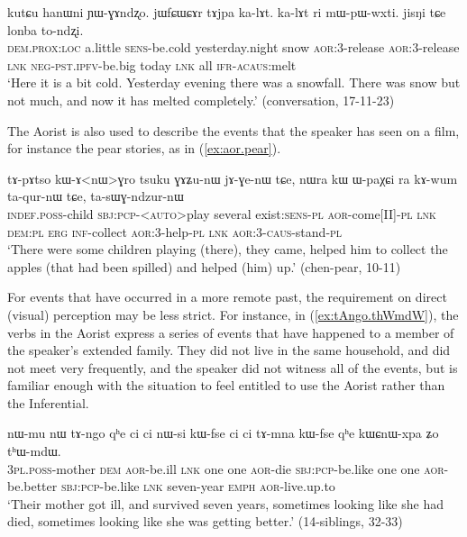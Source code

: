 \begin{exe}
\ex \label{ex:jWfCWCAr.tAjpa.kalAt}
 \gll kutɕu hanɯni ɲɯ-ɣɤndʐo. jɯfɕɯɕɤr tɤjpa ka-lɤt. ka-lɤt ri mɯ-pɯ-wxti. jisŋi tɕe lonba to-ndʐi. \\
 \textsc{dem}.\textsc{prox}:\textsc{loc} a.little \textsc{sens}-be.cold yesterday.night snow \textsc{aor}:3\flobv{}-release \textsc{aor}:3\flobv{}-release  \textsc{lnk} \textsc{neg}-\textsc{pst}.\textsc{ipfv}-be.big today \textsc{lnk} all \textsc{ifr}-\textsc{acaus}:melt \\
\glt `Here it is a bit cold. Yesterday evening there was a snowfall. There was snow but not much, and now it has melted completely.' (conversation, 17-11-23)
\end{exe}

The Aorist is also used to describe the events that the speaker has seen on a film, for instance the pear stories, as in (\ref{ex:aor.pear}). 

\begin{exe}
\ex \label{ex:aor.pear}
 \gll tɤ-pɤtso kɯ-ɤ<nɯ>ɣro tsuku ɣɤʑu-nɯ jɤ-ɣe-nɯ tɕe, nɯra kɯ ɯ-paχɕi ra kɤ-wum ta-qur-nɯ tɕe, ta-sɯɣ-ndzur-nɯ \\
 \textsc{indef}.\textsc{poss}-child \textsc{sbj}:\textsc{pcp}-<\textsc{auto}>play several exist:\textsc{sens}-\textsc{pl} \textsc{aor}-come[II]-\textsc{pl} \textsc{lnk} \textsc{dem}:\textsc{pl} \textsc{erg} \textsc{inf}-collect \textsc{aor}:3\flobv{}-help-\textsc{pl} \textsc{lnk} \textsc{aor}:3\flobv{}-\textsc{caus}-stand-\textsc{pl} \\
 \glt `There were some children playing (there), they came, helped him to collect the apples (that had been spilled) and helped (him) up.' (chen-pear, 10-11)
\end{exe}

For events that have occurred in a more remote past, the requirement on direct (visual) perception may be less strict. For instance, in (\ref{ex:tAngo.thWmdW}), the verbs in the Aorist express a series of events that have happened to a member of the speaker's extended family. They did not live in the same household, and did not meet very frequently, and the speaker did not witness all of the events, but is familiar enough with the situation to feel entitled to use the Aorist rather than the Inferential.

\begin{exe}
\ex \label{ex:tAngo.thWmdW}
 \gll nɯ-mu nɯ tɤ-ngo qʰe ci ci nɯ-si kɯ-fse ci ci tɤ-mna kɯ-fse qʰe kɯɕnɯ-xpa ʑo tʰɯ-mdɯ. \\
 \textsc{3pl}.\textsc{poss}-mother \textsc{dem} \textsc{aor}-be.ill \textsc{lnk} one one \textsc{aor}-die \textsc{sbj}:\textsc{pcp}-be.like  one one \textsc{aor}-be.better  \textsc{sbj}:\textsc{pcp}-be.like \textsc{lnk} seven-year \textsc{emph} \textsc{aor}-live.up.to \\
\glt `Their mother got ill, and survived seven years, sometimes looking like she had died, sometimes looking like she was getting better.' (14-siblings, 32-33)
\end{exe}

